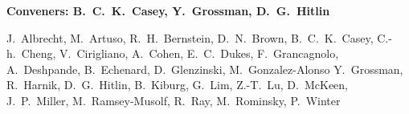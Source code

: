 

\begin{center}

\begin{large} {\bf Conveners: B.~C.~K.~Casey, Y.~Grossman, D.~G.~Hitlin} \end{large}

J.~Albrecht,
M.~Artuso,
R.~H.~Bernstein,
D.~N.~Brown,
B.~C.~K.~Casey,
C.-h.~Cheng,
V.~Cirigliano,
A.~Cohen,
E.~C.~Dukes,
F.~Grancagnolo,
A.~Deshpande,
B.~Echenard,
D.~Glenzinski,
M.~Gonzalez-Alonso
Y.~Grossman,
R.~Harnik,
D.~G.~Hitlin, 
B.~Kiburg,
G.~Lim,
Z.-T.~Lu,
D.~McKeen,
J.~P.~Miller,
M.~Ramsey-Musolf,
R.~Ray,
M.~Rominsky,
P.~Winter 


\end{center}

